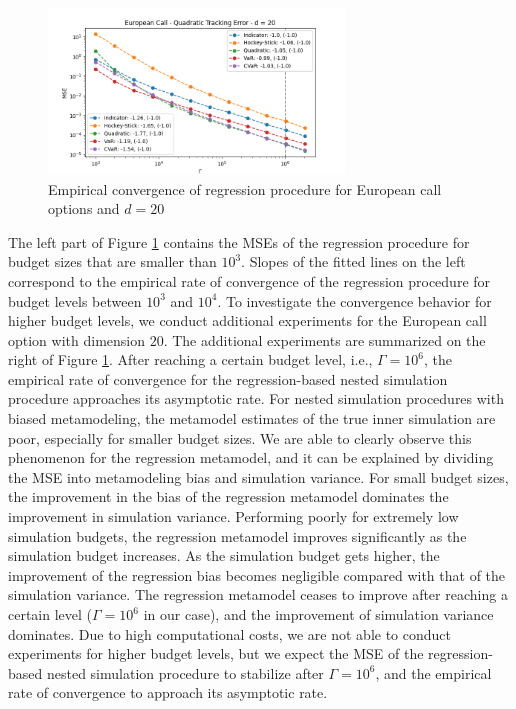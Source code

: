 \begin{figure}[ht]
    \centering
    \includegraphics[width=0.7\textwidth]{./project1/figures/figure3.png}
    \caption{Empirical convergence of regression procedure for European call options and $d=20$}
    \label{fig1:reg_lb} 
\end{figure}

The left part of Figure \ref{fig1:reg_lb} contains the MSEs of the regression procedure for budget sizes that are smaller than $10^3$. 
Slopes of the fitted lines on the left correspond to the empirical rate of convergence of the regression procedure for budget levels between $10^3$ and $10^4$.
To investigate the convergence behavior for higher budget levels, we conduct additional experiments for the European call option with dimension $20$. 
The additional experiments are summarized on the right of Figure \ref{fig1:reg_lb}.
After reaching a certain budget level, i.e., $\Gamma = 10^6$, the empirical rate of convergence for the regression-based nested simulation procedure approaches its asymptotic rate. 
For nested simulation procedures with biased metamodeling, the metamodel estimates of the true inner simulation are poor, especially for smaller budget sizes. 
We are able to clearly observe this phenomenon for the regression metamodel, and it can be explained by dividing the MSE into metamodeling bias and simulation variance.
For small budget sizes, the improvement in the bias of the regression metamodel dominates the improvement in simulation variance. 
Performing poorly for extremely low simulation budgets, the regression metamodel improves significantly as the simulation budget increases.
As the simulation budget gets higher, the improvement of the regression bias becomes negligible compared with that of the simulation variance. 
The regression metamodel ceases to improve after reaching a certain level ($\Gamma = 10^6$ in our case), and the improvement of simulation variance dominates.
Due to high computational costs, we are not able to conduct experiments for higher budget levels, but we expect the MSE of the regression-based nested simulation procedure to stabilize after $\Gamma = 10^6$, and the empirical rate of convergence to approach its asymptotic rate.

